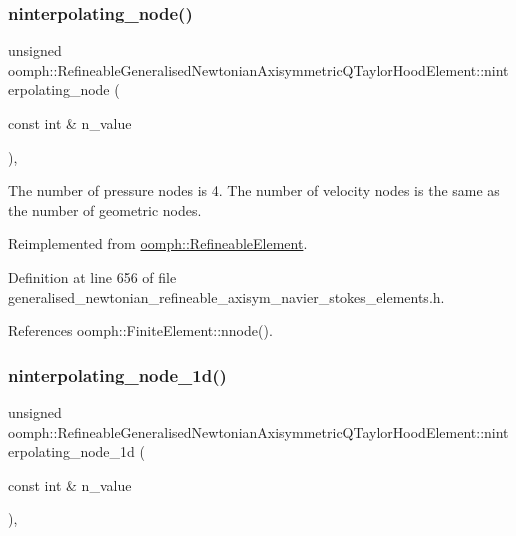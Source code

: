 \subsubsection{\texorpdfstring{ninterpolating\+\_\+node()}{ninterpolating\_node()}}
{\footnotesize\ttfamily unsigned oomph\+::\+Refineable\+Generalised\+Newtonian\+Axisymmetric\+Q\+Taylor\+Hood\+Element\+::ninterpolating\+\_\+node (\begin{DoxyParamCaption}\item[{const int \&}]{n\+\_\+value }\end{DoxyParamCaption})\hspace{0.3cm}{\ttfamily [inline]}, {\ttfamily [virtual]}}



The number of pressure nodes is 4. The number of velocity nodes is the same as the number of geometric nodes. 



Reimplemented from \hyperlink{classoomph_1_1RefineableElement_a8b1b5031b55141567ba24913a21534f4}{oomph\+::\+Refineable\+Element}.



Definition at line 656 of file generalised\+\_\+newtonian\+\_\+refineable\+\_\+axisym\+\_\+navier\+\_\+stokes\+\_\+elements.\+h.



References oomph\+::\+Finite\+Element\+::nnode().

\mbox{\label{classoomph_1_1RefineableGeneralisedNewtonianAxisymmetricQTaylorHoodElement_ae6aee74598fa32891819c7698be40d72}} 
\subsubsection{\texorpdfstring{ninterpolating\+\_\+node\+\_\+1d()}{ninterpolating\_node\_1d()}}
{\footnotesize\ttfamily unsigned oomph\+::\+Refineable\+Generalised\+Newtonian\+Axisymmetric\+Q\+Taylor\+Hood\+Element\+::ninterpolating\+\_\+node\+\_\+1d (\begin{DoxyParamCaption}\item[{const int \&}]{n\+\_\+value }\end{DoxyParamCaption})\hspace{0.3cm}{\ttfamily [inline]}, {\ttfamily [virtual]}}



